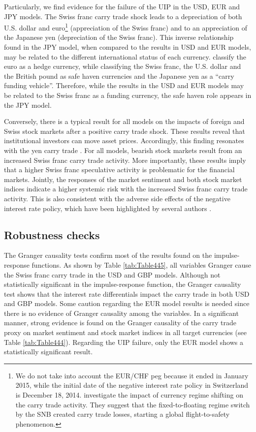 \documentclass[a4paper, twoside]{templates/ociamthesis}
\begin{document}
Particularly, we find evidence for the failure of the UIP in the USD, EUR and JPY models. The Swiss franc carry trade shock leads to a depreciation of both U.S. dollar and euro\footnote{We do not take into account the EUR/CHF peg because it ended in January 2015, while the initial date of the negative interest rate policy in Switzerland is December 18, 2014. \textcite{accominotti2019} investigate the impact of currency regime shifting on the carry trade activity. They suggest that the fixed-to-floating regime switch by the SNB created carry trade losses, starting a global flight-to-safety phenomenon.} (appreciation of the Swiss franc) and to an appreciation of the Japanese yen (depreciation of the Swiss franc). This inverse relationship found in the JPY model, when compared to the results in USD and EUR models, may be related to the different international status of each currency. \textcite{hossfeld2015} classify the euro as a hedge currency, while classifying the Swiss franc, the U.S. dollar and the British pound as safe haven currencies and the Japanese yen as a ``carry funding vehicle''. Therefore, while the results in the USD and EUR models may be related to the Swiss franc as a funding currency, the safe haven role appears in the JPY model.

Conversely, there is a typical result for all models on the impacts of foreign and Swiss stock markets after a positive carry trade shock. These results reveal that institutional investors can move asset prices. Accordingly, this finding resonates with the yen carry trade \autocite{fong2013}. For all models, bearish stock markets result from an increased Swiss franc carry trade activity. More importantly, these results imply that a higher Swiss franc speculative activity is problematic for the financial markets. Jointly, the responses of the market sentiment and both stock market indices indicate a higher systemic risk with the increased Swiss franc carry trade activity. This is also consistent with the adverse side effects of the negative interest rate policy, which have been highlighted by several authors \autocite[see][]{rossi2019}.

\hypertarget{fouronethree}{%
\subsection{Robustness checks}\label{fouronethree}}

The Granger causality tests confirm most of the results found on the impulse-response functions. As shown by Table \ref{tab:Table445}, all variables Granger cause the Swiss franc carry trade in the USD and GBP models. Although not statistically significant in the impulse-response function, the Granger causality test shows that the interest rate differentials impact the carry trade in both USD and GBP models. Some caution regarding the EUR model results is needed since there is no evidence of Granger causality among the variables. In a significant manner, strong evidence is found on the Granger causality of the carry trade proxy on market sentiment and stock market indices in all target currencies (see Table \ref{tab:Table444}). Regarding the UIP failure, only the EUR model shows a statistically significant result.
\end{document}
